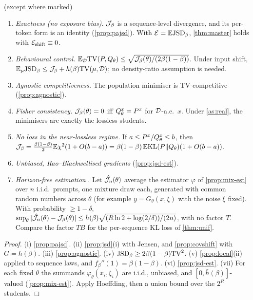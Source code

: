 \begin{theorem}\label{thm:pajsd}
\Pv (except where marked)
\begin{enumerate}[label=(\roman*),nosep]
\item \emph{Exactness (no exposure bias).} $\mathcal{J}_\beta$ is a sequence-level divergence, and its per-token form
is an identity (\cref{prop:pajsd}). With $\mathcal{E}=\mathbb{E}\mathrm{JSD}_\beta$, \cref{thm:master} holds with
$\mathcal{E}_{\mathrm{shift}}\equiv0$.
\item \emph{Behavioural control.} $\mathbb{E}_{\mathcal{D}}\mathrm{TV}(P,Q_\theta)\le\sqrt{\mathcal{J}_\beta(\theta)/(2\beta(1-\beta))}$. Under
input shift, $\mathbb{E}_\mu\mathrm{JSD}_\beta\le\mathcal{J}_\beta+h(\beta)\mathrm{TV}(\mu,\mathcal{D})$; no density-ratio assumption is needed.
\item \emph{Agnostic competitiveness.} The population minimiser is TV-competitive (\cref{prop:agnostic}).
\item \emph{Fisher consistency.} $\mathcal{J}_\beta(\theta)=0$ iff $Q^{x}_{\theta}=P^{x}$ for $\mathcal{D}$-a.e.\ $x$. Under \cref{as:real},
the minimisers are exactly the lossless students.
\item \emph{No loss in the near-lossless regime.} If $a\le P^{x}/Q^{x}_{\theta}\le b$, then
$\mathcal{J}_\beta=\frac{\beta(1-\beta)}2\mathbb{E}\chi^2(1+O(b-a))=\beta(1-\beta)\,\mathbb{E}\mathrm{KL}(P\|Q_\theta)(1+O(b-a))$.
\item \emph{Unbiased, Rao--Blackwellised gradients} (\cref{prop:jsd-est}).
\item \emph{Horizon-free estimation} . Let $\hat{\mathcal{J}}_n(\theta)$ average the estimator $\varphi$
of \cref{prop:mix-est} over $n$ i.i.d.\ prompts, one mixture draw each, generated with common random
numbers across $\theta$ (for example $y=G_\theta(x,\xi)$ with the noise $\xi$ fixed). With probability $\ge1-\delta$,
$\sup_\theta|\hat{\mathcal{J}}_n(\theta)-\mathcal{J}_\beta(\theta)|\le\bar h(\beta)\sqrt{(R\ln2+\log(2/\delta))/(2n)}$, with no factor $T$. Compare
the factor $TB$ for the per-sequence KL loss of \cref{thm:unif}.
\end{enumerate}
\end{theorem}
\begin{proof}
(i) \cref{prop:pajsd}. (ii) \cref{prop:jsd}(i) with Jensen, and \cref{prop:covshift} with $G=h(\beta)$.
(iii) \cref{prop:agnostic}. (iv) $\mathrm{JSD}_\beta\ge2\beta(1-\beta)\mathrm{TV}^2$. (v) \cref{prop:local}(ii) applied to
sequence laws, and $f_\beta''(1)=\beta(1-\beta)$. (vi) \cref{prop:jsd-est}. (vii) For each fixed $\theta$ the summands
$\varphi_\theta(x_i,\xi_i)$ are i.i.d., unbiased, and $[0,\bar h(\beta)]$-valued (\cref{prop:mix-est}). Apply Hoeffding, then a
union bound over the $2^R$ students.
\end{proof}

